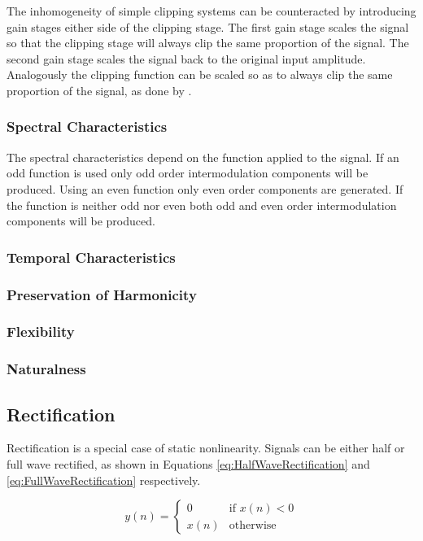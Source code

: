			The inhomogeneity of simple clipping systems can be counteracted by introducing gain stages either
			side of the clipping stage. The first gain stage scales the signal so that the clipping stage will
			always clip the same proportion of the signal. The second gain stage scales the signal back to the
			original input amplitude. Analogously the clipping function can be scaled so as to always clip the
			same proportion of the signal, as done by \citet{deman2014adaptive}.

		\subsubsection*{Spectral Characteristics}
			The spectral characteristics depend on the function applied to the signal. If an odd function is
			used only odd order intermodulation components will be produced. Using an even function only even
			order components are generated. If the function is neither odd nor even both odd and even order
			intermodulation components will be produced.

		\subsubsection*{Temporal Characteristics}
		\subsubsection*{Preservation of Harmonicity}
		\subsubsection*{Flexibility}
		\subsubsection*{Naturalness}

	\subsection{Rectification}
	\label{sec:Excitation-Rectification}
		Rectification is a special case of static nonlinearity. Signals can be either half or full wave rectified,
		as shown in Equations \ref{eq:HalfWaveRectification} and \ref{eq:FullWaveRectification} respectively.

		\begin{equation}
			y(n) = \begin{cases}
				0 & \text{if $x(n) < 0$} \\
				x(n) & \text{otherwise}
			\end{cases}
			\label{eq:HalfWaveRectification}
		\end{equation}

